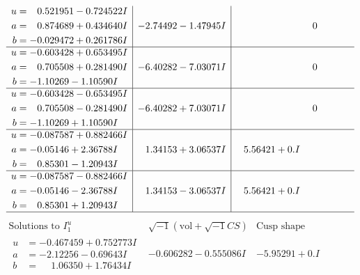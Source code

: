 \documentclass[1p]{elsarticle_modified}
\theoremstyle{definition}
\newcommand{\I}{\sqrt{-1}}
\begin{document}
$$\begin{array}{c|c|c}
\begin{aligned}
u &= \phantom{-}0.521951 - 0.724522 I \\
a &= \phantom{-}0.874689 + 0.434640 I \\
b &= -0.029472 + 0.261786 I\end{aligned}
 & -2.74492 - 1.47945 I & \phantom{-0.000000 } 0 \\ \hline\begin{aligned}
u &= -0.603428 + 0.653495 I \\
a &= \phantom{-}0.705508 + 0.281490 I \\
b &= -1.10269 - 1.10590 I\end{aligned}
 & -6.40282 - 7.03071 I & \phantom{-0.000000 } 0 \\ \hline\begin{aligned}
u &= -0.603428 - 0.653495 I \\
a &= \phantom{-}0.705508 - 0.281490 I \\
b &= -1.10269 + 1.10590 I\end{aligned}
 & -6.40282 + 7.03071 I & \phantom{-0.000000 } 0 \\ \hline\begin{aligned}
u &= -0.087587 + 0.882466 I \\
a &= -0.05146 + 2.36788 I \\
b &= \phantom{-}0.85301 - 1.20943 I\end{aligned}
 & \phantom{-}1.34153 + 3.06537 I & \phantom{-}5.56421 + 0. I\phantom{ +0.000000I} \\ \hline\begin{aligned}
u &= -0.087587 - 0.882466 I \\
a &= -0.05146 - 2.36788 I \\
b &= \phantom{-}0.85301 + 1.20943 I\end{aligned}
 & \phantom{-}1.34153 - 3.06537 I & \phantom{-}5.56421 + 0. I\phantom{ +0.000000I}\\
 \hline 
 \end{array}$$\newpage$$\begin{array}{c|c|c}  
\text{Solutions to }I^u_{1}& \I (\text{vol} + \sqrt{-1}CS) & \text{Cusp shape}\\
 \hline 
\begin{aligned}
u &= -0.467459 + 0.752773 I \\
a &= -2.12256 - 0.69643 I \\
b &= \phantom{-}1.06350 + 1.76434 I\end{aligned}
 & -0.606282 - 0.555086 I & -5.95291 + 0. I\phantom{ +0.000000I} \\ \hline\begin{aligned}

\end{aligned}
\end{array}$$
\end{document}
